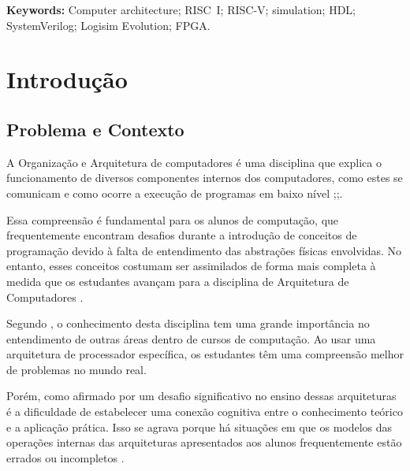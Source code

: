 \documentclass[
	12pt,				%
	openright,			%
	oneside,			%
	a4paper,			%
	english,			%
	french,				%
	spanish,			%
	brazil,				%
	]{abntex2}
\begin{document}
\vspace{1em}
\noindent
\textbf{Keywords:} Computer architecture; RISC~I; RISC-V; simulation; HDL; SystemVerilog; Logisim Evolution; FPGA.

\cleardoublepage
\tableofcontents*
\cleardoublepage


\textual


\chapter{Introdução}
\section{Problema e Contexto}
A Organização e Arquitetura de computadores é uma disciplina que explica o funcionamento de diversos componentes internos dos computadores, como estes se comunicam e como ocorre a execução de programas em baixo nível \cite{soares_simuladores_2015};\cite[p.12]{favero_organizacao_2011};\cite{lourenco_ensino_2005}.

Essa compreensão é fundamental para os alunos de computação, que frequentemente encontram desafios durante a introdução de conceitos de programação devido à falta de entendimento das abstrações físicas envolvidas. No entanto, esses conceitos costumam ser assimilados de forma mais completa à medida que os estudantes avançam para a disciplina de Arquitetura de Computadores \cite{raabe_processadores_2006}.

Segundo , o conhecimento desta disciplina tem  uma grande importância no entendimento de outras áreas dentro de cursos de computação. Ao usar uma arquitetura de processador específica, os estudantes têm uma compreensão melhor de problemas no mundo real.

Porém, como afirmado por  um desafio significativo no ensino dessas arquiteturas é a dificuldade de estabelecer uma conexão cognitiva entre o conhecimento teórico e a aplicação prática. Isso se agrava porque há situações em que os modelos das operações internas das arquiteturas apresentados aos alunos frequentemente estão errados ou incompletos \cite[p.60]{yehezkel_three_2001}.
\end{document}

